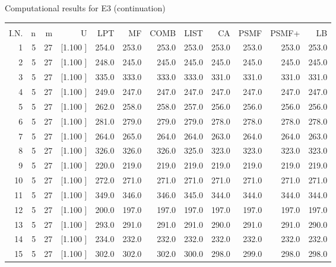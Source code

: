 \documentclass[12pt,a4paper]{article}
\begin{document}
\newpage
\begin{center}
 Computational results for E3 (continuation) {\tiny
\begin{tabular}{r r r r r r r r r r r r}\hline
    &   &   &          &        &        &        &        &        &        &        &       \\[-0.1in]
  I.N.  &  n  &  m  &  U  &  LPT  &  MF  &  COMB  &  LIST  &  CA  & PSMF &PSMF+ & LB \\[0.03in]
\hline
   1&  5& 27&[1.100     ]&   254.0&   253.0&   253.0&   253.0&   253.0&   253.0&   253.0&   253.0\\[-0.02in]
   2&  5& 27&[1.100     ]&   248.0&   245.0&   245.0&   245.0&   245.0&   245.0&   245.0&   245.0\\[-0.02in]
   3&  5& 27&[1.100     ]&   335.0&   333.0&   333.0&   333.0&   331.0&   331.0&   331.0&   331.0\\[-0.02in]
   4&  5& 27&[1.100     ]&   249.0&   247.0&   247.0&   247.0&   247.0&   247.0&   247.0&   247.0\\[-0.02in]
   5&  5& 27&[1.100     ]&   262.0&   258.0&   258.0&   257.0&   256.0&   256.0&   256.0&   256.0\\[-0.02in]
   6&  5& 27&[1.100     ]&   281.0&   279.0&   279.0&   279.0&   278.0&   278.0&   278.0&   278.0\\[-0.02in]
   7&  5& 27&[1.100     ]&   264.0&   265.0&   264.0&   264.0&   263.0&   264.0&   264.0&   263.0\\[-0.02in]
   8&  5& 27&[1.100     ]&   326.0&   326.0&   326.0&   325.0&   323.0&   323.0&   323.0&   323.0\\[-0.02in]
   9&  5& 27&[1.100     ]&   220.0&   219.0&   219.0&   219.0&   219.0&   219.0&   219.0&   219.0\\[-0.02in]
  10&  5& 27&[1.100     ]&   272.0&   271.0&   271.0&   271.0&   271.0&   271.0&   271.0&   271.0\\[-0.02in]
  11&  5& 27&[1.100     ]&   349.0&   346.0&   346.0&   345.0&   344.0&   344.0&   344.0&   344.0\\[-0.02in]
  12&  5& 27&[1.100     ]&   200.0&   197.0&   197.0&   197.0&   197.0&   197.0&   197.0&   197.0\\[-0.02in]
  13&  5& 27&[1.100     ]&   293.0&   291.0&   291.0&   291.0&   290.0&   291.0&   291.0&   290.0\\[-0.02in]
  14&  5& 27&[1.100     ]&   234.0&   232.0&   232.0&   232.0&   232.0&   232.0&   232.0&   232.0\\[-0.02in]
  15&  5& 27&[1.100     ]&   302.0&   302.0&   302.0&   300.0&   298.0&   299.0&   298.0&   298.0\\[-0.02in]

\end{tabular}}
\end{center}
\end{document}
